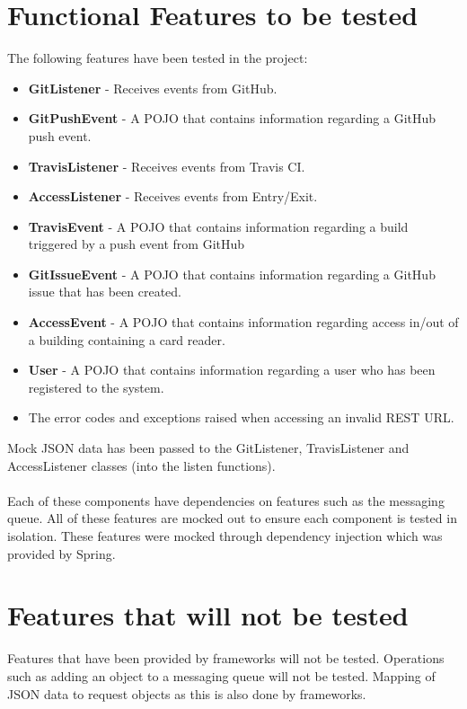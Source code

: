\documentclass[11pt,a4paper]{article}
\begin{document}
\section{Functional Features to be tested}
The following features have been tested in the project:
\begin{itemize}
	\item \textbf{GitListener} - Receives events from GitHub.
	\item \textbf{GitPushEvent} - A POJO that contains information regarding a GitHub push event.
	\item \textbf{TravisListener} - Receives events from Travis CI.
	\item \textbf{AccessListener} - Receives events from Entry/Exit.
	\item \textbf{TravisEvent} - A POJO that contains information regarding a build triggered by a push event from GitHub
	\item \textbf{GitIssueEvent} - A POJO that contains information regarding a GitHub issue that has been created.
	\item \textbf{AccessEvent} - A POJO that contains information regarding access in/out of a building containing a card reader.
	\item \textbf{User} - A POJO that contains information regarding a user who has been registered to the system.
	\item The error codes and exceptions raised when accessing an invalid REST URL.
	 
\end{itemize}

Mock JSON data has been passed to the GitListener, TravisListener and AccessListener classes (into the listen functions). \\\\
Each of these components have dependencies on features such as the messaging queue. All of these features are mocked out to ensure each component is tested in isolation. These features were mocked through dependency injection which was provided by Spring. \\

\section{Features that will not be tested}

Features that have been provided by frameworks will not be tested. Operations such as adding an object to a messaging queue will not be tested. Mapping of JSON data to request objects as this is also done by frameworks.
\end{document}
